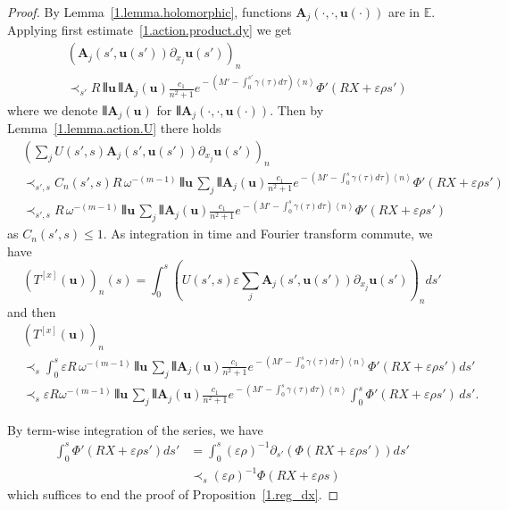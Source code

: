 \documentclass[10pt]{amsart}
\theoremstyle{definition}
\theoremstyle{plain}
\newcommand*\e{\varepsilon}
\newcommand{\dptl}{\partial}%
\newcommand*\EE{{\mathbb E}}
\newcommand*\g{\gamma}
\newcommand{\ubf}{{\mathbf u}}
\newcommand*\A{{\mathbf A}}
\newcommand*\dsp{\displaystyle}
\DeclarePairedDelimiter{\VERT}{|\mkern -1.6mu|\mkern -1.6mu|}{|\mkern -1.6mu|\mkern -1.6mu|}
\begin{document}
\begin{proof}
By Lemma~\ref{1.lemma.holomorphic}, functions ${\mathbf A}_j(\cdot,\cdot, \ubf(\cdot))$ are in $\EE$. Applying first estimate~\eqref{1.action.product.dy} we get
\begin{align*}
& \left(\A_j(s',\ubf(s')) \dptl_{x_j}\ubf(s')\right)_n \\
& \prec_{s'} R \,\VERT{\ubf}\, \VERT{\A_j(\ubf)}
\frac{\dsp c_1}{\dsp n^2+1} e^{{}- (M'- \int_{0}^{s'}\g(\tau)d\tau) \left<n\right>} \Phi'\left(R X+\e\rho s'\right)
\end{align*}
where we denote $\VERT{\A_j(\ubf)}$ for $\VERT{\A_j(\cdot,\cdot, \ubf(\cdot))}$. Then by Lemma~\ref{1.lemma.action.U} there holds
\begin{align*}
& \left(\sum_j U(s',s) \A_j(s',\ubf(s')) \dptl_{x_j}\ubf(s') \right)_n \\
& \prec_{s',s} C_n(s',s) R \,\omega^{-(m-1)}\,\VERT{\ubf}\, \sum_j\VERT{\A_j(\ubf)} \frac{\dsp c_1}{\dsp n^2+1}e^{{}- (M'- \int_{0}^{s}\g(\tau)d\tau) \left<n\right>} \Phi'\left(R X+\e\rho s'\right) \\
& \prec_{s',s} R \,\omega^{-(m-1)}\,\VERT{\ubf}\, \sum_j\VERT{\A_j(\ubf)} \frac{\dsp c_1}{\dsp n^2+1}e^{{}- (M'- \int_{0}^{s}\g(\tau)d\tau) \left<n\right>} \Phi'\left(R X+\e\rho s'\right)
\end{align*}
as $C_n(s',s) \leq 1$. As integration in time and Fourier transform commute, we have
\[
\left(T^{[x]}(\ubf)\right)_n(s) = \int_{0}^{s} \left(U(s',s) \e \sum_j\A_j(s', \ubf(s')) \dptl_{x_j}\ubf(s')\right)_n ds'
\]
and then
\begin{align*}
& \left(T^{[x]}(\ubf)\right)_n \\
& \prec_{s} \int_{0}^{s} \e R \,\omega^{-(m-1)}\,\VERT{\ubf}\, \sum_j\VERT{\A_j(\ubf)} \frac{\dsp c_1}{\dsp n^2+1}e^{{}- (M'- \int_{0}^{s}\g(\tau)d\tau) \left<n\right>} \Phi'\left(R X+\e\rho s'\right) ds' \\
& \prec_{s} \e R\omega^{-(m-1)}\,\VERT{\ubf}\, \sum_j\VERT{\A_j(\ubf)} \frac{\dsp c_1}{\dsp n^2+1}e^{{}- (M'- \int_{0}^{s}\g(\tau)d\tau) \left<n\right>} \int_{0}^{s} \Phi'\left(R X+\e\rho s'\right) \, ds'.
\end{align*}

By term-wise integration of the series, we have
\begin{align*}
\int_{0}^{s} \Phi'\left(RX+\e\rho s'\right) ds' & = \int_{0}^{s} (\e\rho)^{-1} \dptl_{s'} \left(\Phi\left(R X+\e\rho s'\right) \right)ds' \\
& \prec_{s} (\e\rho)^{-1} \Phi\left(R X+\e\rho s\right)
\end{align*}
which suffices to end the proof of Proposition~\ref{1.reg_dx}.
\end{proof}
\end{document}
